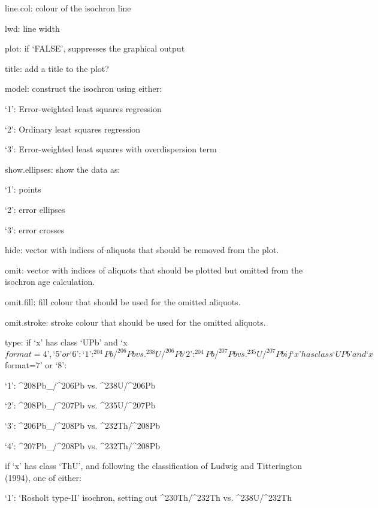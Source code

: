 line.col: colour of the isochron line

     lwd: line width

    plot: if ‘FALSE’, suppresses the graphical output

   title: add a title to the plot?

   model: construct the isochron using either:

          ‘1’: Error-weighted least squares regression

          ‘2’: Ordinary least squares regression

          ‘3’: Error-weighted least squares with overdispersion term

show.ellipses: show the data as:

          ‘1’: points

          ‘2’: error ellipses

          ‘3’: error crosses

    hide: vector with indices of aliquots that should be removed from
          the plot.

    omit: vector with indices of aliquots that should be plotted but
          omitted from the isochron age calculation.

omit.fill: fill colour that should be used for the omitted aliquots.

omit.stroke: stroke colour that should be used for the omitted
          aliquots.

    type: if ‘x’ has class ‘UPb’ and ‘x$format=4’, ‘5’ or ‘6’:

          ‘1’: ^{204}Pb/^{206}Pb vs. ^{238}U/^{206}Pb

          ‘2’: ^{204}Pb/^{207}Pb vs. ^{235}U/^{207}Pb

          if ‘x’ has class ‘UPb’ and ‘x$format=7’ or ‘8’:

          ‘1’: ^{208}Pb{}_\circ/^{206}Pb vs. ^{238}U/^{206}Pb

          ‘2’: ^{208}Pb{}_\circ/^{207}Pb vs. ^{235}U/^{207}Pb

          ‘3’: ^{206}Pb{}_\circ/^{208}Pb vs. ^{232}Th/^{208}Pb

          ‘4’: ^{207}Pb{}_\circ/^{208}Pb vs. ^{232}Th/^{208}Pb

          if ‘x’ has class ‘ThU’, and following the classification of
          Ludwig and Titterington (1994), one of either:

          ‘1’: `Rosholt type-II' isochron, setting out
          ^{230}Th/^{232}Th vs. ^{238}U/^{232}Th

